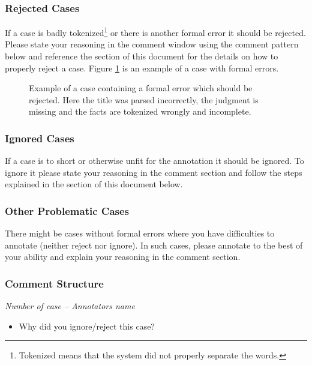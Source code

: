 \documentclass{article}
\begin{document}
\subsubsection{Rejected Cases}
If a case is badly tokenized\footnote{Tokenized means that the system did not properly separate the words.} or there is another formal error it should be rejected. Please state your reasoning in the comment window using the comment pattern below and reference the  section of this document for the details on how to properly reject a case. Figure \ref{reject_case} is an example of a case with formal errors. 
\begin{figure}[h!]
     \caption{Example of a case containing a formal error which should be rejected. Here the title was parsed incorrectly, the judgment is missing and the facts are tokenized wrongly and incomplete.}
     \label{reject_case}
\end{figure}

\subsubsection{Ignored Cases}
If a case is to short or otherwise unfit for the annotation it should be ignored. To ignore it please state your reasoning in the comment section and follow the steps explained in the  section of this document below. 

\subsubsection{Other Problematic Cases}
There might be cases without formal errors where you have difficulties to annotate (neither reject nor ignore). In such cases, please annotate to the best of your ability and explain your reasoning in the comment section.

\subsubsection{Comment Structure}
\begin{mdframed}[frametitle={Comment for rejecting and ignoring case}]
\emph{Number of case – Annotators name}

\begin{itemize}
	\item Why did you ignore/reject this case?
\end{itemize}	
\end{mdframed}
\end{document}
